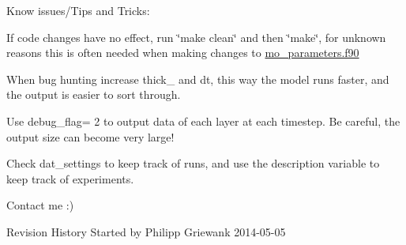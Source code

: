 Know issues/Tips and Tricks:
\begin{DoxyItemize}
\item If code changes have no effect, run \char`\"{}make clean\char`\"{} and then \char`\"{}make\char`\"{}, for unknown reasons this is often needed when making changes to \hyperlink{mo__parameters_8f90}{mo\_\-parameters.f90}
\item When bug hunting increase thick\_ and dt, this way the model runs faster, and the output is easier to sort through.
\item Use debug\_\-flag= 2 to output data of each layer at each timestep. Be careful, the output size can become very large!
\item Check dat\_\-settings to keep track of runs, and use the description variable to keep track of experiments.
\item Contact me :)
\end{DoxyItemize}

\begin{DoxyParagraph}{Revision History}
Started by Philipp Griewank 2014-\/05-\/05 
\end{DoxyParagraph}
